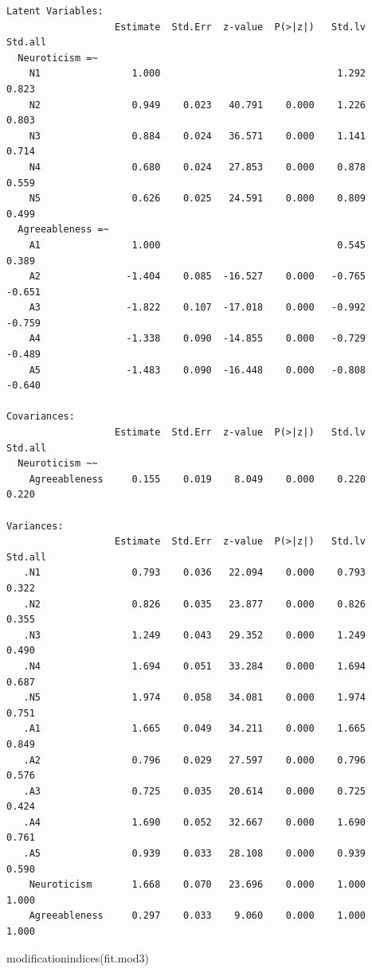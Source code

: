 \documentclass[
  letterpaper,
  DIV=11,
  numbers=noendperiod]{scrreprt}
\newenvironment{Shaded}{\begin{snugshade}}{\end{snugshade}}
\newcommand{\FunctionTok}[1]{\textcolor[rgb]{0.28,0.35,0.67}{#1}}
\newcommand{\NormalTok}[1]{\textcolor[rgb]{0.00,0.23,0.31}{#1}}
\begin{document}
\begin{verbatim}
Latent Variables:
                   Estimate  Std.Err  z-value  P(>|z|)   Std.lv  Std.all
  Neuroticism =~                                                        
    N1                1.000                               1.292    0.823
    N2                0.949    0.023   40.791    0.000    1.226    0.803
    N3                0.884    0.024   36.571    0.000    1.141    0.714
    N4                0.680    0.024   27.853    0.000    0.878    0.559
    N5                0.626    0.025   24.591    0.000    0.809    0.499
  Agreeableness =~                                                      
    A1                1.000                               0.545    0.389
    A2               -1.404    0.085  -16.527    0.000   -0.765   -0.651
    A3               -1.822    0.107  -17.018    0.000   -0.992   -0.759
    A4               -1.338    0.090  -14.855    0.000   -0.729   -0.489
    A5               -1.483    0.090  -16.448    0.000   -0.808   -0.640

Covariances:
                   Estimate  Std.Err  z-value  P(>|z|)   Std.lv  Std.all
  Neuroticism ~~                                                        
    Agreeableness     0.155    0.019    8.049    0.000    0.220    0.220

Variances:
                   Estimate  Std.Err  z-value  P(>|z|)   Std.lv  Std.all
   .N1                0.793    0.036   22.094    0.000    0.793    0.322
   .N2                0.826    0.035   23.877    0.000    0.826    0.355
   .N3                1.249    0.043   29.352    0.000    1.249    0.490
   .N4                1.694    0.051   33.284    0.000    1.694    0.687
   .N5                1.974    0.058   34.081    0.000    1.974    0.751
   .A1                1.665    0.049   34.211    0.000    1.665    0.849
   .A2                0.796    0.029   27.597    0.000    0.796    0.576
   .A3                0.725    0.035   20.614    0.000    0.725    0.424
   .A4                1.690    0.052   32.667    0.000    1.690    0.761
   .A5                0.939    0.033   28.108    0.000    0.939    0.590
    Neuroticism       1.668    0.070   23.696    0.000    1.000    1.000
    Agreeableness     0.297    0.033    9.060    0.000    1.000    1.000
\end{verbatim}

\begin{Shaded}
\begin{Highlighting}[]
\FunctionTok{modificationindices}\NormalTok{(fit.mod3)}
\end{Highlighting}
\end{Shaded}
\end{document}
